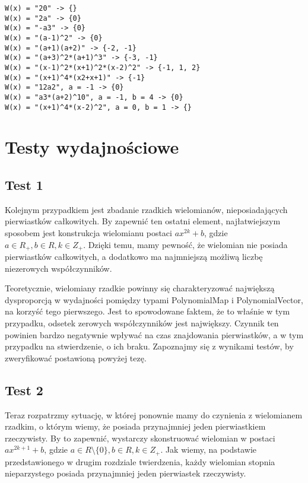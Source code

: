 \documentclass[twoside,a4paper]{book}
\begin{document}
\begin{lstlisting}
W(x) = "20" -> {}
W(x) = "2a" -> {0}
W(x) = "-a3" -> {0}
W(x) = "(a-1)^2" -> {0}
W(x) = "(a+1)(a+2)" -> {-2, -1}
W(x) = "(a+3)^2*(a+1)^3" -> {-3, -1}
W(x) = "(x-1)^2*(x+1)^2*(x-2)^2" -> {-1, 1, 2}
W(x) = "(x+1)^4*(x2+x+1)" -> {-1}
W(x) = "12a2", a = -1 -> {0}
W(x) = "a3*(a+2)^10", a = -1, b = 4 -> {0}
W(x) = "(x+1)^4*(x-2)^2", a = 0, b = 1 -> {}
\end{lstlisting}

\section{Testy wydajnościowe}


\subsection{Test 1}

Kolejnym przypadkiem jest zbadanie rzadkich wielomianów, nieposiadających pierwiastków całkowitych. By zapewnić ten ostatni element, najłatwiejszym sposobem jest konstrukcja wielomianu postaci $ax^{2k}+b$, gdzie $a \in R_+, b \in R, k \in Z_+$. Dzięki temu, mamy pewność, że wielomian nie posiada pierwiastków całkowitych, a dodatkowo ma najmniejszą możliwą liczbę niezerowych współczynników.

Teoretycznie, wielomiany rzadkie powinny się charakteryzować największą dysproporcją w wydajności pomiędzy typami PolynomialMap i PolynomialVector, na korzyść tego pierwszego. Jest to spowodowane faktem, że to właśnie w tym przypadku, odsetek zerowych współczynników jest największy. Czynnik ten powinien bardzo negatywnie wpływać na czas znajdowania pierwiastków, a w tym przypadku na stwierdzenie, o ich braku. Zapoznajmy się z wynikami testów, by zweryfikować postawioną powyżej tezę.

\subsection{Test 2}

Teraz rozpatrzmy sytuację, w której ponownie mamy do czynienia z wielomianem rzadkim, o którym wiemy, że posiada przynajmniej jeden pierwiastkiem rzeczywisty. By to zapewnić, wystarczy skonstruować wielomian w postaci $ax^{2k+1}+b$, gdzie $a \in R\setminus\{0\}, b \in R, k \in Z_+$. Jak wiemy, na podstawie przedstawionego w drugim rozdziale twierdzenia, każdy wielomian stopnia nieparzystego posiada przynajmniej jeden pierwiastek rzeczywisty. 
\end{document}
